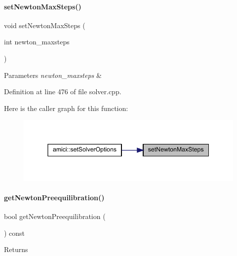 \paragraph{\texorpdfstring{setNewtonMaxSteps()}{setNewtonMaxSteps()}}
{\footnotesize\ttfamily void set\+Newton\+Max\+Steps (\begin{DoxyParamCaption}\item[{int}]{newton\+\_\+maxsteps }\end{DoxyParamCaption})}


\begin{DoxyParams}{Parameters}
{\em newton\+\_\+maxsteps} & \\
\hline
\end{DoxyParams}


Definition at line 476 of file solver.\+cpp.

Here is the caller graph for this function\+:
\nopagebreak
\begin{figure}[H]
\begin{center}
\leavevmode
\includegraphics[width=345pt]{classamici_1_1_solver_abf2e868e186c724c8ab939ba261ef314_icgraph}
\end{center}
\end{figure}
\mbox{\label{classamici_1_1_solver_a75aabe2e004edaba96db48b0abd3fc6f}} 
\paragraph{\texorpdfstring{getNewtonPreequilibration()}{getNewtonPreequilibration()}}
{\footnotesize\ttfamily bool get\+Newton\+Preequilibration (\begin{DoxyParamCaption}{ }\end{DoxyParamCaption}) const}

\begin{DoxyReturn}{Returns}

\end{DoxyReturn}


